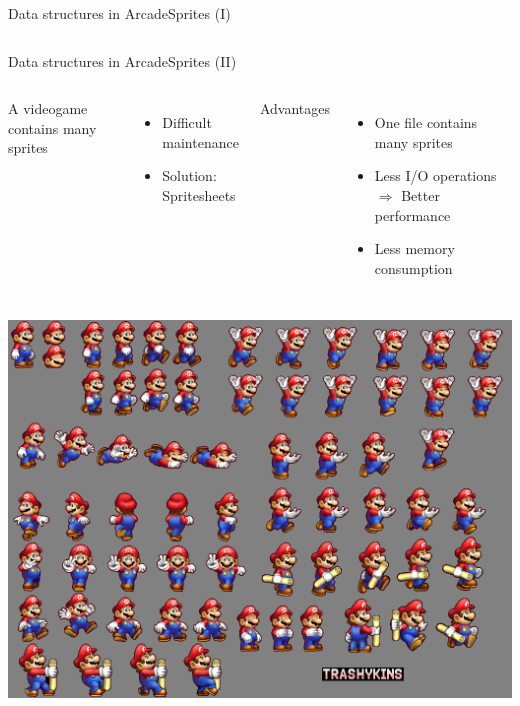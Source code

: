 \documentclass[10pt,compress]{beamer} %
\begin{document}
{\begin{frame}{Data structures in Arcade}{Sprites (I)}
\begin{columns}
   \end{columns}
\end{frame}

\begin{frame}{Data structures in Arcade}{Sprites (II)}
    \begin{columns}
    A videogame contains many sprites
        \begin{itemize}
        \item Difficult maintenance
        \item Solution: Spritesheets
	    \end{itemize}

    Advantages
        \begin{itemize}
        \item One file contains many sprites
        \item Less I/O operations $\Rightarrow$ Better performance
        \item Less memory consumption
	    \end{itemize}
   \end{columns}

    \centering

    \begin{columns}
		\includegraphics[width=\linewidth]{figs/mario-spritesheet.png}


\end{columns}
\end{frame}}
\end{document}
